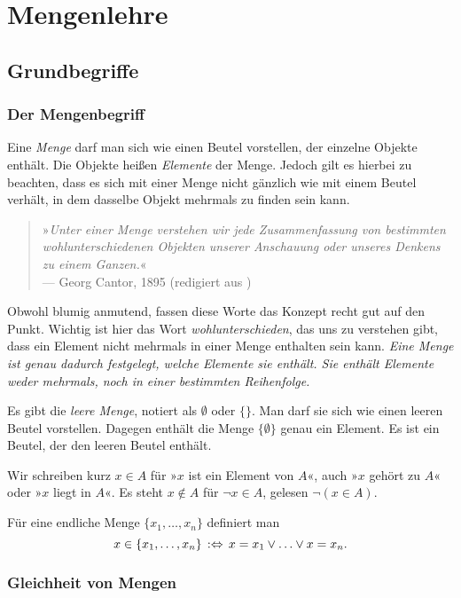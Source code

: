 
\chapter{Mengenlehre}

\section{Grundbegriffe}

\subsection{Der Mengenbegriff}

Eine \emph{Menge} darf man sich wie einen Beutel
vorstellen, der einzelne Objekte enthält. Die Objekte heißen
\emph{Elemente} der Menge. Jedoch gilt es hierbei zu
beachten, dass es sich mit einer Menge nicht gänzlich wie mit einem
Beutel verhält, in dem dasselbe Objekt mehrmals zu finden sein kann.
\begin{quote}
»\emph{Unter einer Menge verstehen wir jede Zusammenfassung von
bestimmten wohlunterschiedenen Objekten unserer Anschauung oder
unseres Denkens zu einem Ganzen.}«\\
--- Georg Cantor, 1895 (redigiert aus \cite{Cantor})
\end{quote}
Obwohl blumig anmutend, fassen diese Worte das Konzept recht gut
auf den Punkt. Wichtig ist hier das Wort \emph{wohlunterschieden},
das uns zu verstehen gibt, dass ein Element nicht mehrmals in einer
Menge enthalten sein kann. \emph{Eine Menge ist genau dadurch festgelegt,
welche Elemente sie enthält. Sie enthält Elemente weder mehrmals, noch
in einer bestimmten Reihenfolge.}

Es gibt die \emph{leere Menge}, notiert als
$\emptyset$ oder $\{\}$. Man darf sie sich wie einen leeren Beutel
vorstellen. Dagegen enthält die Menge $\{\emptyset\}$ genau ein Element.
Es ist ein Beutel,  der den leeren Beutel enthält.

Wir schreiben kurz $x\in A$ für »$x$ ist ein Element von $A$«,
auch »$x$ gehört zu $A$« oder »$x$ liegt in $A$«.
Es steht $x\notin A$ für $\lnot x\in A$, gelesen $\lnot (x\in A)$.

Für eine endliche Menge $\{x_1,\ldots,x_n\}$ definiert man
\[x\in\{x_1,\ldots,x_n\}\,:\Leftrightarrow\, x=x_1\lor\ldots\lor x=x_n.\]

\subsection{Gleichheit von Mengen}


